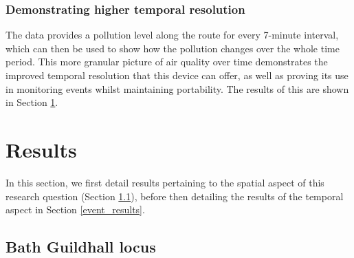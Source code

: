 \documentclass[11pt,twosided,a4paper]{report}
\begin{document}
\subsubsection{Demonstrating higher temporal resolution}

The data provides a pollution level along the route for every 7-minute interval, which can then be used to show how the pollution changes over the whole time period. This more granular picture of air quality over time demonstrates the improved temporal resolution that this device can offer, as well as proving its use in monitoring events whilst maintaining portability. The results of this are shown in Section \ref{results:q2}.

\section{Results} \label{results:q2}

In this section, we first detail results pertaining to the spatial aspect of this research question (Section \ref{locus_results}), before then detailing the results of the temporal aspect in Section \ref{event_results}.

\subsection{Bath Guildhall locus} \label{locus_results}
\end{document}
